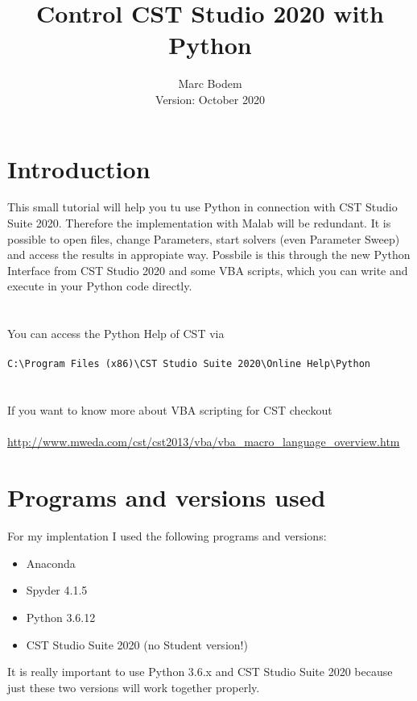 \documentclass[12pt,accentcolor=tud2b, colorback, openany]{tudreport}
\title{Control CST Studio 2020 with Python}
\subtitle{Marc Bodem\\Version: October 2020}
\begin{document}
	
	\maketitle
	\tableofcontents
	\newpage

	\chapter{Introduction}
	This small tutorial will help you tu use Python in connection with CST Studio Suite 2020. Therefore the implementation with Malab will be redundant. It is possible to open files, change Parameters, start solvers (even Parameter Sweep) and access the results in appropiate way. Possbile is this through the new Python Interface from CST Studio 2020 and some VBA scripts, which you can write and execute in your Python code directly.\\
	\\
	\\
	You can access the Python Help of CST via\\
	\\
	\texttt{C:\textbackslash Program Files (x86)\textbackslash CST Studio Suite 2020\textbackslash Online Help\textbackslash Python}\\
	\\
	\\
	If you want to know more about VBA scripting for CST checkout\\
	\\
	\href{http://www.mweda.com/cst/cst2013/vba/vba_macro_language_overview.htm}{http://www.mweda.com/cst/cst2013/vba/vba\_macro\_language\_overview.htm}
	
	\chapter{Programs and versions used}
	For my implentation I used the following programs and versions:
	\begin{itemize}
		\item Anaconda
		\item Spyder 4.1.5
		\item Python 3.6.12
		\item CST Studio Suite 2020 (no Student version!)
	\end{itemize}
	It is really important to use Python 3.6.x and CST Studio Suite 2020 because just these two versions will work together properly.
	
\end{document}
